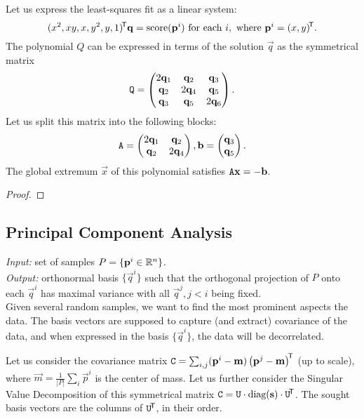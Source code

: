 Let us express the least-squares fit as a linear system:
$$(x^2, xy, x, y^2, y, 1)^{\!\mathsf{T}} \mathbf{q} = \textrm{score}(\mathbf{p}^i) \text{ for each } i, \text{ where } \mathbf{p}^i = (x, y)^{\!\mathsf{T}}.$$
The polynomial $Q$ can be expressed in terms of the solution $\vec q$ as the symmetrical matrix
$$\mathtt{Q} = \begin{pmatrix}
 2 \mathbf{q}_1 & \mathbf{q}_2 & \mathbf{q}_3 \\
 \mathbf{q}_2 & 2 \mathbf{q}_4 & \mathbf{q}_5 \\
 \mathbf{q}_3 & \mathbf{q}_5 & 2 \mathbf{q}_6
\end{pmatrix}.$$
Let us split this matrix into the following blocks:
$$\mathtt{A} = \begin{pmatrix}
 2 \mathbf{q}_1 & \mathbf{q}_2 \\
 \mathbf{q}_2 & 2 \mathbf{q}_4 \\
\end{pmatrix},
\mathbf{b} = \begin{pmatrix}
 \mathbf{q}_3 \\
 \mathbf{q}_5 \\
\end{pmatrix}.$$
The global extremum $\vec x$ of this polynomial satisfies $\mathtt{A} \mathbf{x} = -\mathbf{b}$.

\begin{proof}
\todo{\dots}
\end{proof}

\subsection{Principal Component Analysis}
\textit{Input:} set of samples $P = \{\mathbf{p}^i \in \mathbb{R}^n \}$.\\
\textit{Output:} orthonormal basis $\{\vec q^i\}$ such that the orthogonal projection of $P$ onto each $\vec q^i$ has maximal variance with all $\vec q^j, j < i$ being fixed.\\

Given several random samples, we want to find the most prominent aspects the data.
The basis vectors are supposed to capture (and extract) covariance of the data, and when expressed in the basis $\{\vec q^i\}$, the data will be decorrelated.

Let us consider the covariance matrix $\mathtt{C} = \sum_{i,j} (\mathbf{p}^i - \mathbf{m}) \left(\mathbf{p}^j - \mathbf{m} \right) ^{\!\mathsf{T}}$ (up to scale), where $\vec m = \frac 1 {|P|} \sum_i \vec p^i$ is the center of mass. Let us further consider the Singular Value Decomposition of this symmetrical matrix $\mathtt{C} = \mathtt{U} \cdot \textrm{diag}(\mathbf{s}) \cdot \mathtt{U}^{\!\mathsf{T}}$.
The sought basis vectors are the columns of $\mathtt{U}^{\!\mathsf{T}}$, in their order.

